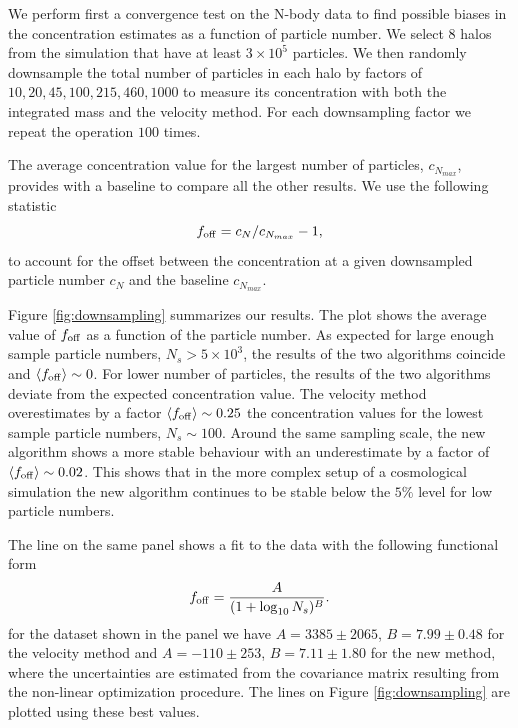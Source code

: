 \documentclass{emulateapj}
\begin{document}
We perform first a convergence test on the N-body data to find
possible biases in the concentration estimates as a function of
particle number.  
We select $8$ halos from the simulation that have at
least $3\times 10^5$ particles.  
We then randomly downsample the total number of particles in each halo
by factors of $10, 20, 45, 100, 215, 460, 1000$ to measure its
concentration with both the integrated mass and the velocity
method. For each downsampling factor we repeat the operation $100$
times.  

The average concentration value for the largest number of particles,
$c_{N_{max}}$, provides with a baseline to compare all the other
results.  
We use the following statistic
\begin{equation}
f_{\rm off} = c_{N} / c_{N_{max}} - 1,
\label{eq:f_off}
\end{equation}
to account for the offset between the concentration at a given
downsampled particle number $c_{N}$ and the baseline $c_{N_{max}}$.

Figure \ref{fig:downsampling} summarizes our results.  The plot shows
the average value of $f_{\rm off}$ as a function of the particle
number.  As expected for large enough sample particle numbers,
$N_{s}>5\times 10^3$, the results of the two algorithms coincide and
$\langle f_{\rm off}\rangle\sim 0$.  For lower number of particles,
the results of the two algorithms deviate from the expected
concentration value.  The velocity method overestimates by a factor
$\langle f_{\rm off}\rangle\sim 0.25$ the concentration values for the
lowest sample particle numbers, $N_{s}\sim 100$.  Around the same
sampling scale, the new algorithm shows a more stable behaviour with
an underestimate by a factor of $\langle f_{\rm off}\rangle \sim 0.02$.
This shows that in the more complex setup of a cosmological 
  simulation the new algorithm continues to be stable below the $5\%$
level for low particle numbers.

The line on the same panel shows a fit to the data with the following
functional form 
\begin{equation}
f_{\rm off} = \frac{A}{(1+\log_{10}N_s)^{B}}.
\label{eq:f_off_fit}
\end{equation} 
for the dataset shown in the panel we have $A=3385\pm 2065$, $B=7.99\pm0.48
$ for the velocity method and $A=-110\pm 253$, $B=7.11\pm1.80$ for the
new method, where the uncertainties are estimated from the covariance 
matrix resulting from the non-linear optimization procedure. The lines
on Figure \ref{fig:downsampling} are plotted using these best values. 
\end{document}

